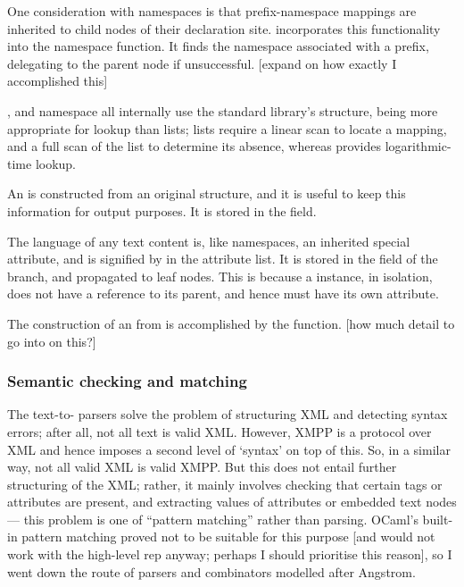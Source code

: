 One consideration with namespaces is that prefix-namespace mappings are inherited to child nodes of their declaration site.  incorporates this functionality into the namespace function. It finds the namespace associated with a prefix, delegating to the parent node if unsuccessful. [expand on how exactly I accomplished this]

,  and namespace all internally use the standard library's  structure, being more appropriate for lookup than lists; lists require a linear scan to locate a mapping, and a full scan of the list to determine its absence, whereas  provides logarithmic-time lookup.

An  is constructed from an original  structure, and it is useful to keep this information for output purposes. It is stored in the  field.

The language of any text content is, like namespaces, an inherited special attribute, and is signified by  in the attribute list. It is stored in the  field of the branch, and propagated to leaf  nodes. This is because a  instance, in isolation, does not have a reference to its parent, and hence must have its own  attribute.

The construction of an  from  is accomplished by the  function. [how much detail to go into on this?]

\subsubsection{Semantic checking and matching} \label{sec:matchers}
The text-to- parsers solve the problem of structuring XML and detecting syntax errors; after all, not all text is valid XML. However, XMPP is a protocol over XML and hence imposes a second level of `syntax' on top of this. So, in a similar way, not all valid XML is valid XMPP. But this does not entail further structuring of the XML; rather, it mainly involves checking that certain tags or attributes are present, and extracting values of attributes or embedded text nodes --- this problem is one of ``pattern matching'' rather than parsing. OCaml's built-in pattern matching proved not to be suitable for this purpose [and would not work with the high-level rep anyway; perhaps I should prioritise this reason], so I went down the route of parsers and combinators modelled after Angstrom.

